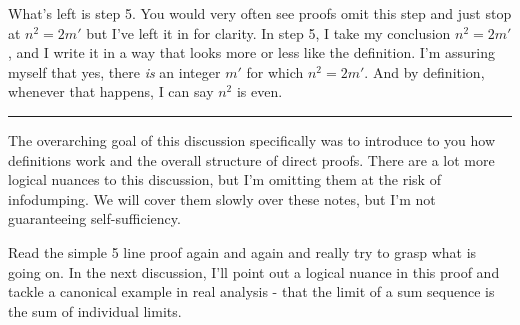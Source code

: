 What's left is step 5. You would very often see proofs omit this step and just stop at $n^2 = 2m'$ but I've left it in for clarity. In step 5, I take my conclusion $n^2 = 2m'$, and I write it in a way that looks more or less like the definition. I'm assuring myself that yes, there \textit{is} an integer $m'$ for which $n^2 = 2m'$. And by definition, whenever that happens, I can say $n^2$ is even.\\

\hrule

The overarching goal of this discussion specifically was to introduce to you how definitions work and the overall structure of direct proofs. There are a lot more logical nuances to this discussion, but I'm omitting them at the risk of infodumping. We will cover them slowly over these notes, but I'm not guaranteeing self-sufficiency.

Read the simple 5 line proof again and again and really try to grasp what is going on. In the next discussion, I'll point out a logical nuance in this proof and tackle a canonical example in real analysis - that the limit of a sum sequence is the sum of individual limits.
